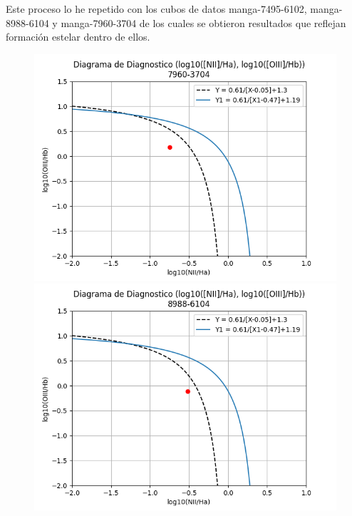\documentclass[10pt,twocolumn,a4paper]{opticajnl}
\begin{document}
Este proceso lo he repetido con los cubos de datos manga-7495-6102, manga-8988-6104 y manga-7960-3704 de los cuales se obtieron resultados que reflejan formación estelar dentro de ellos. 

\begin{figure}[h!]
    \centering
    \includegraphics[width=1\linewidth]{../Codigos/diagramasDeDiagnostico/diagrama7960-3704.png}
    \includegraphics[width=1\linewidth]{../Codigos/diagramasDeDiagnostico/diagrama8988-6104.png}

\end{figure}
\end{document}
